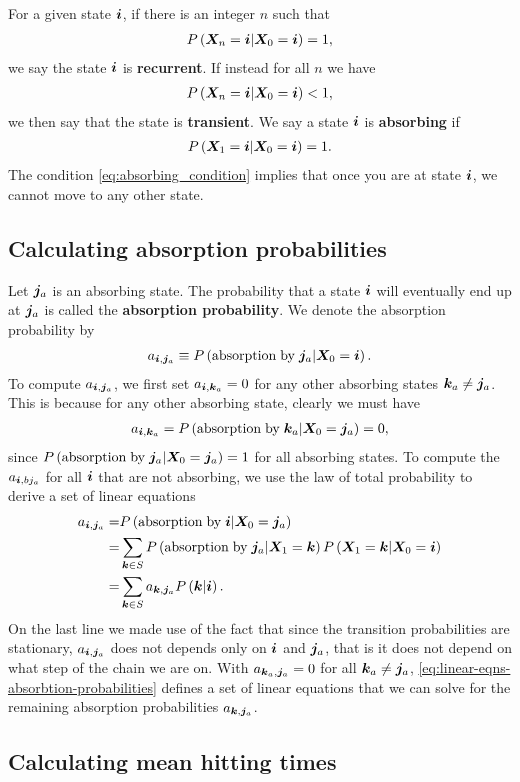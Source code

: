 For a given state ${\bm i}$, if there is an integer $n$ such that 
\begin{align}
    P\left({\bm X}_n = {\bm i} | {\bm X}_0 = {\bm i}\right) = 1
    ,
\end{align}
we say the state ${\bm i}$ is \textbf{recurrent}.
If instead for all $n$ we have 
\begin{align}
    P\left({\bm X}_n = {\bm i} | {\bm X}_0 = {\bm i}\right) < 1
    ,
\end{align}
we then say that the state is \textbf{transient}.
We say a state ${\bm i}$ is \textbf{absorbing} if
\begin{align}
    \label{eq:absorbing_condition}
    P\left({\bm X}_1 = {\bm i} | {\bm X}_0 = {\bm i}\right) = 1
    .
\end{align}
The condition \eqref{eq:absorbing_condition} implies that once you are at state ${\bm i}$, we cannot move to any other state.

\subsection{Calculating absorption probabilities}
Let ${\bm j}_a$ is an absorbing state. 
The probability that a state ${\bm i}$ will eventually end up at ${\bm j}_a$ is called the \textbf{absorption probability}.
We denote the absorption probability by
\begin{align}
    a_{{\bm i},{\bm j}_a}
    \equiv
    P\left(\mathrm{absorption\;by\;}{\bm j}_a|{\bm X}_0={\bm i}\right)
    .
\end{align}
To compute $a_{{\bm i}, {\bm j}_a}$, we first set $a_{{\bm i}, {\bm k}_a}=0$ for any other absorbing states ${\bm k}_a\neq{\bm j}_a$.
This is because for any other absorbing state, clearly we must have
\begin{align}
    a_{{\bm i},{\bm k}_a}
    = 
    P\left(\mathrm{absorption\;by\;}{\bm k}_a|{\bm X}_0={\bm j}_a\right)
    =
    0
    ,
\end{align}
since $P\left(\mathrm{absorption\;by\;}{\bm j}_a|{\bm X}_0={\bm j}_a\right)=1$ for all absorbing states.
To compute the $a_{{\bm i},bj_a}$ for all ${\bm i}$ that are not absorbing, we use the law of total probability to derive a set of linear equations
\begin{align}
    \label{eq:linear-eqns-absorbtion-probabilities}
    a_{{\bm i},{\bm j}_a}
    =&
    P\left(\mathrm{absorption\;by\;}{\bm i}|{\bm X}_0={\bm j}_a\right)
    \nonumber\\
    =&
    \sum_{{\bm k}\in S} P\left(\mathrm{absorption\;by\;}{\bm j}_a|{\bm X}_1={\bm k}\right)P\left({\bm X}_1={\bm k}|{\bm X}_0={\bm i}\right)
    \nonumber\\
    =&
    \sum_{{\bm k}\in S} a_{{\bm k},{\bm j}_a} P\left({\bm k}|{\bm i}\right)  
    .
\end{align}
On the last line we made use of the fact that since the transition probabilities are stationary, $a_{{\bm i},{\bm j}_a}$ does not depends only on ${\bm i}$ and ${\bm j}_a$, that is it does not depend on what step of the chain we are on.
With $a_{{\bm k}_a,{\bm j}_a}=0$ for all ${\bm k}_a\neq{\bm j}_a$, \eqref{eq:linear-eqns-absorbtion-probabilities} defines a set of linear equations that we can solve for the remaining absorption probabilities $a_{{\bm k},{\bm j}_a}$.

\subsection{Calculating mean hitting times}


